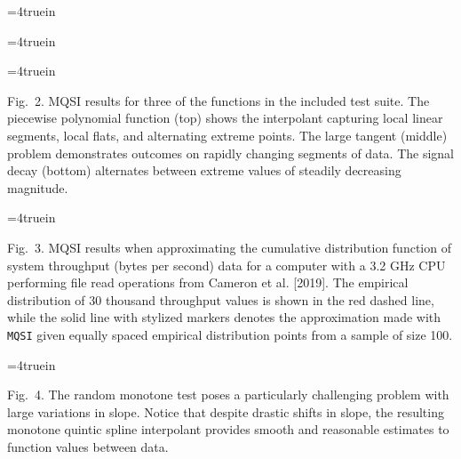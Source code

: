
\topinsert
\textBlack
\centerline{\epsfxsize=4truein }
\centerline{\epsfxsize=4truein }
\centerline{\epsfxsize=4truein }
{\narrower\noindent\rmVIII Fig.\ 2.
{\ttVIII MQSI} results for three of the functions in the included test
suite. The {\itVIII piecewise polynomial} function (top) shows the
interpolant capturing local linear segments, local flats, and
alternating extreme points. The {\itVIII large tangent} (middle)
problem demonstrates outcomes on rapidly changing segments of data.
The {\itVIII signal decay} (bottom) alternates between extreme values
of steadily decreasing magnitude.
\par}
\vskip 6mm
\centerline{\epsfxsize=4truein }
{\narrower\noindent\rmVIII Fig.\ 3.
{\ttVIII MQSI} results when approximating the cumulative distribution
function of system throughput (bytes per second) data for a computer
with a 3.2 GHz CPU performing file read operations from Cameron et al.
[2019]. The empirical distribution of 30 thousand throughput values is
shown in the red dashed line, while the solid line with stylized
markers denotes the approximation made with {\tt MQSI} given
equally spaced empirical distribution points from a sample of size 100.
\par}
\endinsert

\topinsert
\centerline{\epsfxsize=4truein }
{\narrower\noindent\rmVIII  Fig.\ 4.
The {\itVIII random monotone} test poses a particularly challenging
problem with large variations in slope. Notice that despite drastic
shifts in slope, the resulting monotone quintic spline interpolant
provides smooth and reasonable estimates to function values between data.
\par}
\iffalse
\vskip 15mm
\centerline{\epsfxsize=4truein \epsffile{vis/7-runtimes-10.eps}}
\centerline{\epsfxsize=4truein \epsffile{vis/8-runtimes-100.eps}}
{\everymath={\scriptstyle} \narrower\noindent\rmVIII Fig.\ 5.
Median total runtime of the routine {\tt MQSI} for number of data points
$n=10$
to 100 (top) and $n=100$ to 1000 (bottom), generated from 100
repeated trials averaged over $14$ different testing functions. The
timings are colored by major algorithmic component, but the vast
majority of execution time is spent solving the banded linear system
of equations in the {\ttVIII FIT\_SPLINE} routine. The runtimes for
the quadratic facet (Algorithm 1) take roughly one microsecond
($10^{-6}$ seconds) per breakpoint, while the binary search
(Algorithm 4) takes roughly four microseconds per breakpoint.
\par}
\fi
\endinsert

